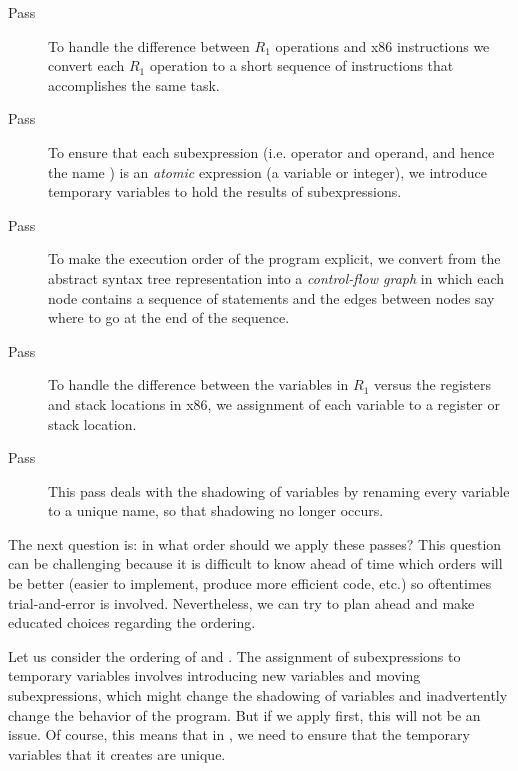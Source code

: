 \documentclass[11pt]{book}
\begin{document}
\begin{description}
\item[Pass ] To handle the difference between
  $R_1$ operations and x86 instructions we convert each $R_1$
  operation to a short sequence of instructions that accomplishes the
  same task.

\item[Pass ] To ensure that each
  subexpression (i.e. operator and operand, and hence the name
  ) is an \emph{atomic} expression (a variable or
  integer), we introduce temporary variables to hold the results
  of subexpressions.
  
\item[Pass ] To make the execution order of the
  program explicit, we convert from the abstract syntax tree
  representation into a \emph{control-flow graph} in which each node
  contains a sequence of statements and the edges between nodes say
  where to go at the end of the sequence.

\item[Pass ] To handle the difference between the
  variables in $R_1$ versus the registers and stack locations in x86,
  we assignment of each variable to a register or stack location.

\item[Pass ] This pass deals with the shadowing of variables
  by renaming every variable to a unique name, so that shadowing no
  longer occurs.
\end{description}

The next question is: in what order should we apply these passes? This
question can be challenging because it is difficult to know ahead of
time which orders will be better (easier to implement, produce more
efficient code, etc.) so oftentimes trial-and-error is
involved. Nevertheless, we can try to plan ahead and make educated
choices regarding the ordering.

Let us consider the ordering of  and
. The assignment of subexpressions to
temporary variables involves introducing new variables and moving
subexpressions, which might change the shadowing of variables and
inadvertently change the behavior of the program.  But if we apply
 first, this will not be an issue. Of course, this means
that in , we need to ensure that the
temporary variables that it creates are unique.
\end{document}

